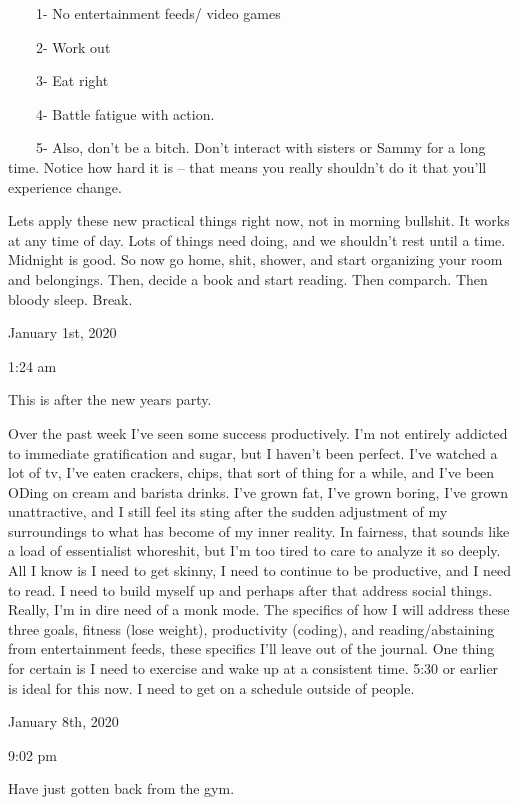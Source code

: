 ~~~~1- No entertainment feeds/ video games

~~~~2- Work out

~~~~3- Eat right

~~~~4- Battle fatigue with action.

~~~~5- Also, don't be a bitch. Don't interact with sisters or Sammy for
a long time. Notice how hard it is -- that means you really shouldn't do
it that you'll experience change.

Lets apply these new practical things right now, not in morning
bullshit. It works at any time of day. Lots of things need doing, and we
shouldn't rest until a time. Midnight is good. So now go home, shit,
shower, and start organizing your room and belongings. Then, decide a
book and start reading. Then comparch. Then bloody sleep. Break.

\bigskip
\bigskip
January 1st, 2020

1:24 am

This is after the new years party.

Over the past week I've seen some success productively. I'm not entirely
addicted to immediate gratification and sugar, but I haven't been
perfect. I've watched a lot of tv, I've eaten crackers, chips, that sort
of thing for a while, and I've been ODing on cream and barista drinks.
I've grown fat, I've grown boring, I've grown unattractive, and I still
feel its sting after the sudden adjustment of my surroundings to what
has become of my inner reality. In fairness, that sounds like a load of
essentialist whoreshit, but I'm too tired to care to analyze it so
deeply. All I know is I need to get skinny, I need to continue to be
productive, and I need to read. I need to build myself up and perhaps
after that address social things. Really, I'm in dire need of a monk
mode. The specifics of how I will address these three goals, fitness
(lose weight), productivity (coding), and reading/abstaining from
entertainment feeds, these specifics I'll leave out of the journal. One
thing for certain is I need to exercise and wake up at a consistent
time. 5:30 or earlier is ideal for this now. I need to get on a schedule
outside of people.

\bigskip
\bigskip
January 8th, 2020

9:02 pm

Have just gotten back from the gym.

